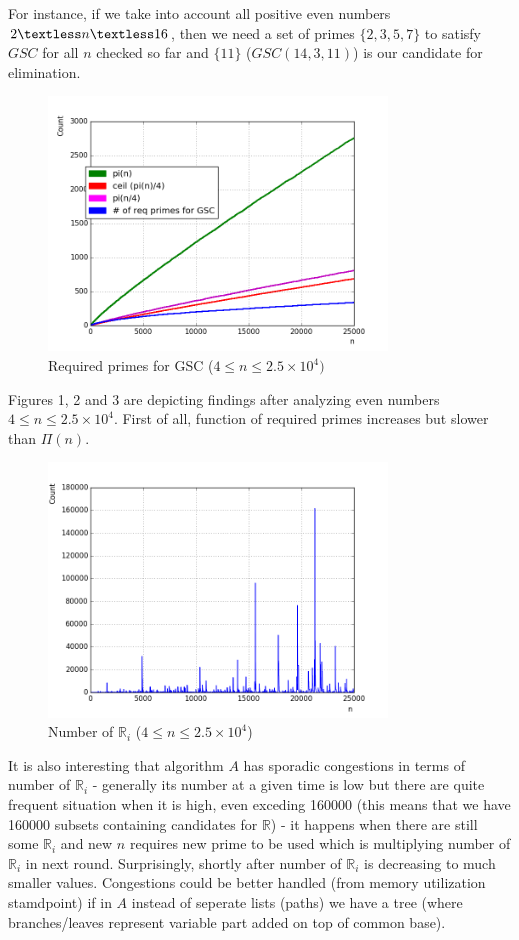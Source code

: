 \documentclass[10pt,twocolumn]{article}
\begin{document}
For instance, if we take into account all positive even numbers $2 \textless n \textless 16$, then we need a set of primes $\{2,3,5,7\}$ to satisfy $GSC$ for all $n$ checked so far and $\{11\}$ ($GSC(14, 3, 11)$) is our candidate for elimination.	

\begin{figure}[!ht]
\centering
\captionsetup{justification=centering}
\includegraphics[width=9cm]{f_required_primes}
\caption[caption]{Required primes for GSC ($4 \leq n \leq 2.5 \times 10^4)$}
\label{fig:requiredprimes}
\end{figure}	

Figures 1, 2 and 3 are depicting findings after analyzing even numbers $4 \leq n \leq 2.5 \times 10^4$. First of all, function of required primes increases but slower than $\Pi(n)$.

\begin{figure}[!ht]
\centering
\captionsetup{justification=centering}
\includegraphics[width=9cm]{f_number_of_possible_sets}
\caption[caption]{Number of $\mathbb{R}_i$ ($4 \leq n \leq 2.5 \times 10^4$)}
\label{fig:numberofsets}
\end{figure}

It is also interesting that algorithm $A$ has sporadic congestions in terms of number of $\mathbb{R}_i$ - generally its number at a given time is low but there are quite frequent situation when it is high, even exceding 160000 (this means that we have 160000 subsets containing candidates for $\mathbb{R}$) - it happens when there are still some $\mathbb{R}_i$ and new $n$ requires new prime to be used which is multiplying number of $\mathbb{R}_i$ in next round. Surprisingly, shortly after number of $\mathbb{R}_i$ is decreasing to much smaller values. Congestions could be better handled (from memory utilization stamdpoint) if in $A$ instead of seperate lists (paths) we have a tree (where branches/leaves represent variable part added on top of common base).
\end{document}
